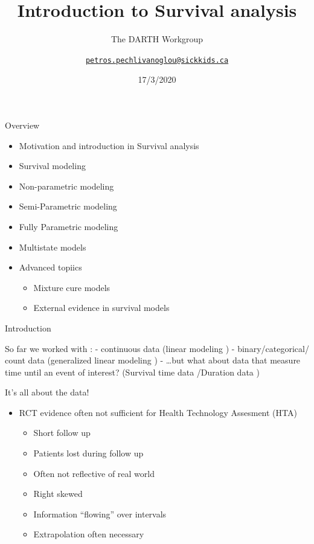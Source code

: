 \documentclass[
  ignorenonframetext,
]{beamer}
\title{Introduction to Survival analysis}
\subtitle{The DARTH Workgroup}
\author{\href{mailto:petros.pechlivanoglou@sickkids.ca}{\nolinkurl{petros.pechlivanoglou@sickkids.ca}}}
\date{17/3/2020}
\providecommand{\tightlist}{%
  \setlength{\itemsep}{0pt}\setlength{\parskip}{0pt}}
\begin{document}
\frame{\titlepage}

\begin{frame}{Overview}
\protect\hypertarget{overview}{}

\begin{itemize}
\tightlist
\item
  Motivation and introduction in Survival analysis
\item
  Survival modeling
\item
  Non-parametric modeling
\item
  Semi-Parametric modeling
\item
  Fully Parametric modeling
\item
  Multistate models
\item
  Advanced topiics

  \begin{itemize}
  \tightlist
  \item
    Mixture cure models
  \item
    External evidence in survival models
  \end{itemize}
\end{itemize}

\end{frame}

\begin{frame}{Introduction}
\protect\hypertarget{introduction}{}

So far we worked with : - continuous data (linear modeling ) -
binary/categorical/ count data (generalized linear modeling ) -
\ldots{}but what about data that measure time until an event of
interest? (Survival time data /Duration data )

\end{frame}

\begin{frame}{It's all about the data!}
\protect\hypertarget{its-all-about-the-data}{}

\begin{itemize}
\tightlist
\item
  RCT evidence often not sufficient for Health Technology Assesment
  (HTA)

  \begin{itemize}
  \tightlist
  \item
    Short follow up
  \item
    Patients lost during follow up
  \item
    Often not reflective of real world
  \item
    Right skewed\\
  \item
    Information ``flowing'' over intervals
  \item
    Extrapolation often necessary
  \end{itemize}
\end{itemize}

\end{frame}
\end{document}
